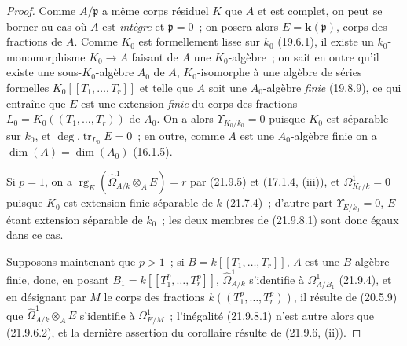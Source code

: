 \begin{proof}
Comme $A/\mathfrak p$ a même corps résiduel $K$ que $A$ et est complet, on
peut se borner au cas où $A$ est \emph{intègre} et $\mathfrak p=0$~; on posera
alors $E=\boldsymbol{k}(\mathfrak p)$, corps des fractions de $A$. Comme $K_0$ est
formellement lisse sur $k_0$ (19.6.1), il existe un $k_0$-monomorphisme
$K_0\to A$ faisant de $A$ une $K_0$-algèbre~; on sait en outre qu'il existe
une sous-$K_0$-algèbre $A_0$ de $A$, $K_0$-isomorphe à une algèbre de séries
formelles $K_0[[T_1,\ldots,T_r]]$ et telle que $A$ soit une $A_0$-algèbre
\emph{finie} (19.8.9), ce qui entraîne que $E$ est une extension \emph{finie} du
corps des fractions $L_0=K_0((T_1,\ldots,T_r))$ de $A_0$. On a alors
$\Upsilon_{K_0/k_0}=0$ puisque $K_0$ est séparable sur $k_0$, et
$\deg.\operatorname{tr}_{L_0}E=0$~; en outre, comme $A$ est une
$A_0$-algèbre finie on a $\dim(A)=\dim(A_0)$ (16.1.5).

Si $p=1$, on a
$\operatorname{rg}_E(\widehat\Omega^1_{A/k}\otimes_AE)=r$ par (21.9.5) et
(17.1.4, (iii)), et $\Omega^1_{K_0/k}=0$ puisque $K_0$ est extension finie
séparable de $k$ (21.7.4)~; d'autre part $\Upsilon_{E/k_0}=0$, $E$ étant
extension séparable de $k_0$~; les deux membres de (21.9.8.1) sont donc égaux
dans ce cas.

Supposons maintenant que $p>1$~; si $B=k[[T_1,\ldots,T_r]]$, $A$ est une
$B$-algèbre finie, donc, en posant $B_1=k[[T_1^p,\ldots,T_r^p]]$,
$\widehat\Omega^1_{A/k}$ s'identifie à $\Omega^1_{A/B_1}$ (21.9.4), et en
désignant par $M$ le corps des fractions $k((T_1^p,\ldots,T_r^p))$, il
résulte de (20.5.9) que $\widehat\Omega^1_{A/k}\otimes_AE$ s'identifie à
$\Omega^1_{E/M}$~; l'inégalité (21.9.8.1) n'est autre alors que (21.9.6.2),
et la dernière assertion du corollaire résulte de (21.9.6, (ii)).
\end{proof}
